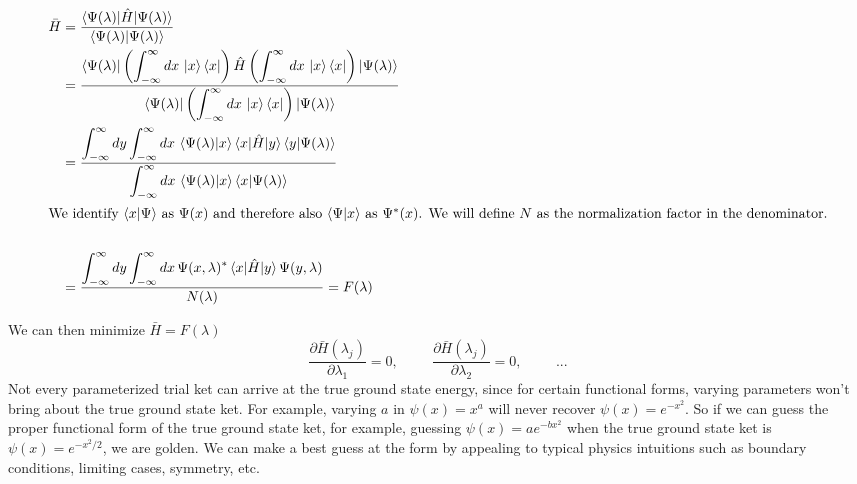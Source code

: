 \documentclass[12pt]{article}
\numberwithin{equation}{section}
\begin{document}
\begin{align*}
    \bar{H} &= \frac{\braket{\Psi(\lambda) | \hat{H} | \Psi(\lambda)}}{\braket{\Psi(\lambda) | \Psi(\lambda)}}\\
    &= \frac{\displaystyle \bra{\Psi(\lambda)} \left(\int_{-\infty}^{\infty}dx \, \ket{x}\bra{x}\right) \hat{H} \left(\int_{-\infty}^{\infty}dx \, \ket{x}\bra{x}\right)\ket{\Psi(\lambda)}}{\displaystyle \bra{\Psi(\lambda)} \left(\int_{-\infty}^{\infty}dx \, \ket{x}\bra{x}\right) \ket{\Psi(\lambda)}}\\
    &= \frac{\displaystyle \int_{-\infty}^{\infty} dy \int_{-\infty}^{\infty} dx \, \braket{\Psi(\lambda) | x}\braket{x | \hat{H} | y} \braket{y | \Psi(\lambda)}}{\displaystyle \int_{-\infty}^{\infty} dx \, \braket{\Psi(\lambda) | x}\braket{x | \Psi(\lambda)}}\\
    \intertext{We identify $\braket{x | \Psi}$ as $\Psi(x)$ and therefore also $\braket{\Psi| x}$ as $\Psi^*(x)$. We will define $N$ as the normalization factor in the denominator.}\\
    &= \frac{\displaystyle \int_{-\infty}^{\infty} dy \int_{-\infty}^{\infty} dx \, \Psi(x, \lambda)^* \braket{x | \hat{H} | y} \Psi(y, \lambda)}{N(\lambda)} = F(\lambda)
\end{align*}

We can then minimize $\bar{H} = F(\lambda)$
\begin{equation*}
    \frac{\partial{\bar{H}(\lambda_j)}}{\partial{\lambda_1}} = 0, \hspace{1cm}\frac{\partial{\bar{H}(\lambda_j)}}{\partial{\lambda_2}} = 0, \hspace{1cm}...
\end{equation*}
Not every parameterized trial ket can arrive at the true ground state energy, since for certain functional forms, varying parameters won't bring about the true ground state ket. For example, varying $a$ in $\psi(x) = x^a$ will never recover $\psi(x) = e^{-x^2}$. So if we can guess the proper functional form of the true ground state ket, for example, guessing $\psi(x) = ae^{-bx^2}$ when the true ground state ket is $\psi(x) = e^{-x^2/2}$, we are golden. We can make a best guess at the form by appealing to typical physics intuitions such as boundary conditions, limiting cases, symmetry, etc.
\end{document}
